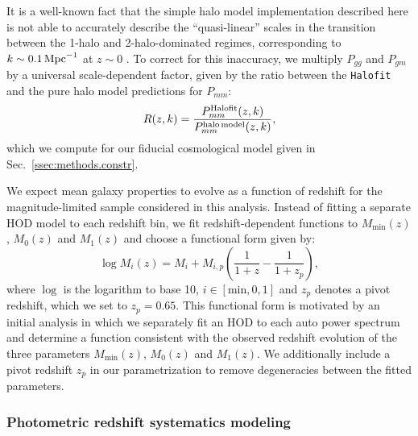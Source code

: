 \documentclass[a4paper,11pt]{article}
\begin{document}
    It is a well-known fact that the simple halo model implementation described here is not able to accurately describe the ``quasi-linear'' scales in the transition between the 1-halo and 2-halo-dominated regimes, corresponding to $k\sim0.1\,{\rm Mpc}^{-1}$ at $z\sim0$ \citep{2015MNRAS.454.1958M}. To correct for this inaccuracy, we multiply $P_{gg}$ and $P_{gm}$ by a universal scale-dependent factor, given by the ratio between the {\tt Halofit} and the pure halo model predictions for $P_{mm}$:
    \begin{equation}
      R(z,k)=\frac{P^{\rm Halofit}_{mm}(z,k)}{P^{\rm halo\,model}_{mm}(z,k)},
    \end{equation}
 which we compute for our fiducial cosmological model given in Sec.~\ref{ssec:methods.constr}.
 
    We expect mean galaxy properties to evolve as a function of redshift for the magnitude-limited sample considered in this analysis. Instead of fitting a separate HOD model to each redshift bin, we fit redshift-dependent functions to $M_{\mathrm{min}}(z)$, $M_{0}(z)$ and $M_{1}(z)$ and choose a functional form given by:
    \begin{equation}
      \log{M_{i}(z)} = M_{i} + M_{i, p} \left(\frac{1}{1+z} - \frac{1}{1+z_{p}}\right),
    \end{equation}
    where $\log$ is the logarithm to base 10, $i \in [\mathrm{min}, 0, 1]$ and $z_{p}$ denotes a pivot redshift, which we set to $z_{p} = 0.65$. This functional form is motivated by an initial analysis in which we separately fit an HOD to each auto power spectrum and determine a function consistent with the observed redshift evolution of the three parameters $M_{\mathrm{min}}(z)$, $M_{0}(z)$ and $M_{1}(z)$. We additionally include a pivot redshift $z_{p}$ in our parametrization to remove degeneracies between the fitted parameters.

\subsubsection{Photometric redshift systematics modeling}\label{sssec:methods.theory.photoz_syst}
\end{document}
